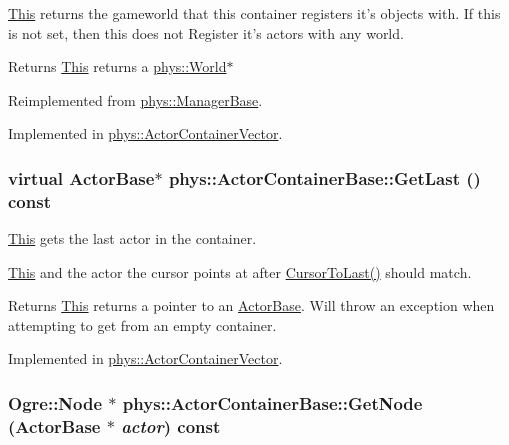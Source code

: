\hyperlink{structThis}{This} returns the gameworld that this container registers it's objects with. If this is not set, then this does not Register it's actors with any world. \begin{DoxyReturn}{Returns}
\hyperlink{structThis}{This} returns a \hyperlink{classphys_1_1World}{phys::World}$\ast$ 
\end{DoxyReturn}


Reimplemented from \hyperlink{classphys_1_1ManagerBase_addfd62fbc444ca4c2aba40768d1b284e}{phys::ManagerBase}.



Implemented in \hyperlink{classphys_1_1ActorContainerVector_a5519eb0000073a2f397e158bfc368349}{phys::ActorContainerVector}.

\hypertarget{classphys_1_1ActorContainerBase_a8efeffd5ae22085fe01af791b3ea559e}{
\subsubsection[{GetLast}]{\setlength{\rightskip}{0pt plus 5cm}virtual {\bf ActorBase}$\ast$ phys::ActorContainerBase::GetLast () const}}
\label{d1/d00/classphys_1_1ActorContainerBase_a8efeffd5ae22085fe01af791b3ea559e}


\hyperlink{structThis}{This} gets the last actor in the container. 

\hyperlink{structThis}{This} and the actor the cursor points at after \hyperlink{classphys_1_1ActorContainerBase_afad072e018a04c190e5e5fb93b82b354}{CursorToLast()} should match. \begin{DoxyReturn}{Returns}
\hyperlink{structThis}{This} returns a pointer to an \hyperlink{classphys_1_1ActorBase}{ActorBase}. Will throw an exception when attempting to get from an empty container. 
\end{DoxyReturn}


Implemented in \hyperlink{classphys_1_1ActorContainerVector_a211f6e419ef0b753cecf2c662a54511e}{phys::ActorContainerVector}.

\hypertarget{classphys_1_1ActorContainerBase_a9813fe23051cc1a324bfedd4d35d27ad}{
\subsubsection[{GetNode}]{\setlength{\rightskip}{0pt plus 5cm}Ogre::Node $\ast$ phys::ActorContainerBase::GetNode ({\bf ActorBase} $\ast$ {\em actor}) const}}
\label{d1/d00/classphys_1_1ActorContainerBase_a9813fe23051cc1a324bfedd4d35d27ad}


